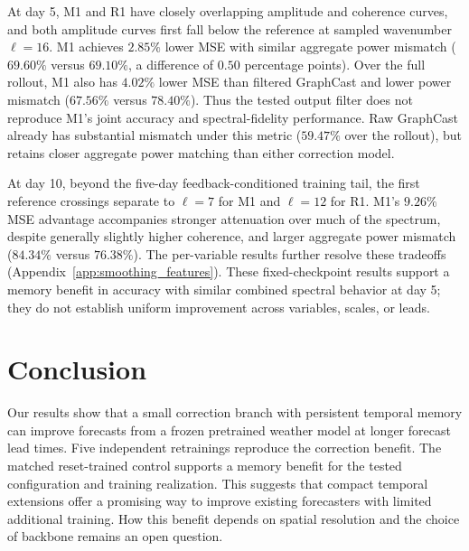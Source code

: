 \documentclass{article}
\newcommand{\vfourchange}[1]{{\color{blue}#1}}
\newcommand{\vfourred}[1]{{\color{blue}#1}}
\begin{document}
\vfourred{At day 5, M1 and \vfourchange{R1} have closely overlapping amplitude and coherence curves, and both amplitude curves first fall below the reference at sampled wavenumber $\ell=16$. M1 achieves $2.85\%$ lower MSE with similar aggregate power mismatch ($69.60\%$ versus $69.10\%$, a difference of $0.50$ percentage points). Over the full rollout, M1 also has $4.02\%$ lower MSE than filtered GraphCast and lower power mismatch ($67.56\%$ versus $78.40\%$). Thus the tested output filter does not reproduce M1's joint accuracy and spectral-fidelity performance. Raw GraphCast already has substantial mismatch under this metric ($59.47\%$ over the rollout), but retains closer aggregate power matching than either correction model.}

\vfourred{At day 10, beyond the five-day feedback-conditioned training tail, the first reference crossings separate to $\ell=7$ for M1 and $\ell=12$ for \vfourchange{R1}. M1's $9.26\%$ MSE advantage accompanies stronger attenuation over much of the spectrum, despite generally slightly higher coherence, and larger aggregate power mismatch ($84.34\%$ versus $76.38\%$). The per-variable results further resolve these tradeoffs (Appendix~\ref{app:smoothing_features}). These fixed-checkpoint results support a memory benefit in accuracy with similar combined spectral behavior at day 5; they do not establish uniform improvement across variables, scales, or leads.}



\section{Conclusion}

Our results show that a small correction branch with persistent temporal memory can improve forecasts from a frozen pretrained weather model at longer forecast lead times. \vfourchange{Five independent retrainings reproduce the correction benefit. The matched reset-trained control supports a memory benefit for the tested configuration and training realization.} This suggests that compact temporal extensions offer a promising way to improve existing forecasters with limited additional training. How this benefit depends on spatial resolution and the choice of backbone remains an open question.
\end{document}
